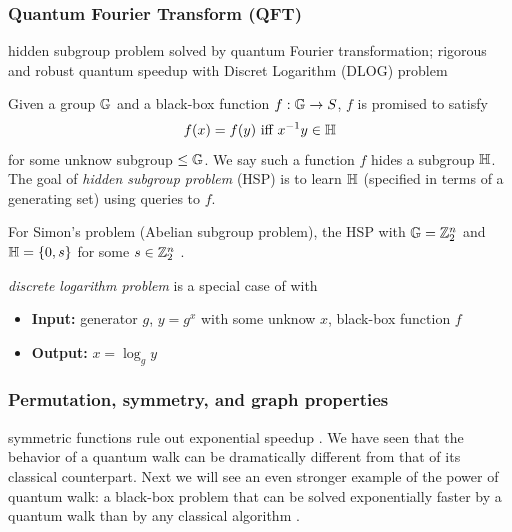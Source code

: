 \subsubsection{Quantum Fourier Transform (QFT)}
hidden subgroup problem solved by quantum Fourier transformation\cite{childsQuantumAlgorithmsAlgebraic2010};
rigorous and robust quantum speedup with Discret Logarithm (DLOG) problem \cite{liuRigorousRobustQuantum2021}
\begin{definition}\label{prm:hidden_subgroup}
	Given a group $\mathbb{G}$ and a black-box function $f:\mathbb{G}\to S$, 
	$f$ is promised to satisfy 
	\begin{equation}
		f(x) =f(y) \text{ iff } x^{-1}y \in \mathbb{H} 
	\end{equation}
	for some unknow subgroup $\le \mathbb{G}$.
	We say such a function $f$ hides a subgroup $\mathbb{H}$.
	The goal of \emph{hidden subgroup problem} (HSP) is to learn $\mathbb{H}$
	(specified in terms of a generating set) using queries to $f$.
\end{definition}
\begin{remark}
	For Simon's problem (Abelian subgroup problem), the HSP with $\mathbb{G} = \mathbb{Z}^n_2$ and $\mathbb{H} = \qty{ 0, s }$ for some $s \in \mathbb{Z}_2^n$ .
\end{remark}
\begin{definition}\label{prm:dlog}
	\emph{discrete logarithm problem} is a special case of  with 
	\begin{itemize}
		\item \textbf{Input:} generator $g$, $y=g^x$ with some unknow $x$, black-box function $f$
		\item \textbf{Output:} $x=\log_g y$
	\end{itemize}
\end{definition}

\subsubsection{Permutation, symmetry, and graph properties}
symmetric functions rule out exponential speedup
\cite{ben-davidSymmetriesGraphProperties2020}.
We have seen that the behavior of a quantum walk can be dramatically different from that of its classical counterpart. Next we will see an even stronger example of the power of quantum walk: a black-box problem that can be solved exponentially faster by a quantum walk than by any classical algorithm \cite{childsExponentialAlgorithmicSpeedup2003}.

